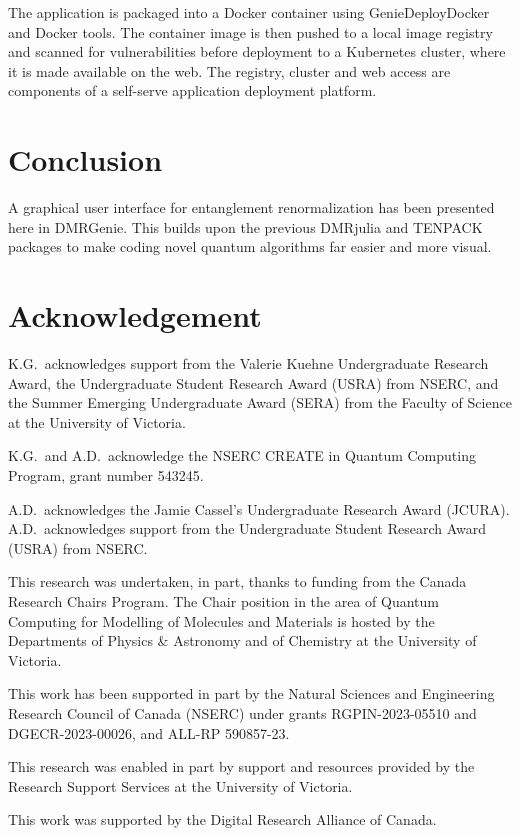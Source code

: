 \documentclass{juliacon}
\begin{document}
The application is packaged into a Docker container using GenieDeployDocker and Docker tools.  The container image is then pushed to a local image registry and scanned for vulnerabilities before deployment to a Kubernetes cluster, where it is made available on the web.  The registry,  cluster and web access are components of a self-serve application deployment platform.

\section{Conclusion}

A graphical user interface for entanglement renormalization has been presented here in DMRGenie. This builds upon the previous DMRjulia and TENPACK packages to make coding novel quantum algorithms far easier and more visual. 

\section{Acknowledgement}

K.G.~acknowledges support from the Valerie Kuehne Undergraduate Research Award, the Undergraduate Student Research Award (USRA) from NSERC, and the Summer Emerging Undergraduate Award (SERA) from the Faculty of Science at the University of Victoria. 

K.G.~and A.D.~acknowledge the NSERC CREATE in Quantum Computing Program, grant number 543245.

A.D.~acknowledges the Jamie Cassel's Undergraduate Research Award (JCURA). A.D.~acknowledges support from the Undergraduate Student Research Award (USRA) from NSERC.

This research was undertaken, in part, thanks to funding from the Canada Research Chairs Program. The Chair position in the area of Quantum Computing for Modelling of Molecules and Materials is hosted by the Departments of Physics \& Astronomy and of Chemistry at the University of Victoria. 

This work has been supported in part by the Natural Sciences and Engineering Research Council of Canada (NSERC) under grants RGPIN-2023-05510 and DGECR-2023-00026, and ALL-RP 590857-23.

This research was enabled in part by support and resources provided by the Research Support Services at the University of Victoria.

This work was supported by the Digital Research Alliance of Canada.
\end{document}
